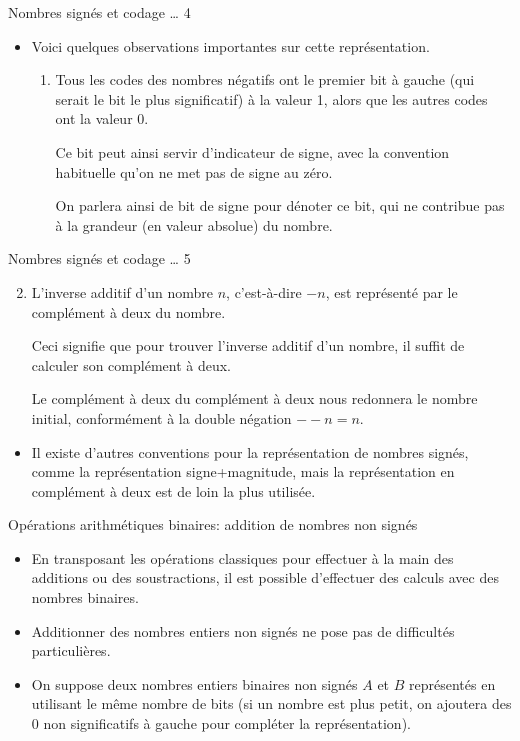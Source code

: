 \documentclass[presentation]{beamer}
\begin{document}
\begin{frame}[label={sec:orgbff1b59}]{Nombres signés et codage \ldots{} 4}
\begin{itemize}
\item Voici quelques observations importantes sur cette représentation.

\begin{enumerate}
\item Tous les codes des nombres négatifs ont le premier bit à gauche (qui serait le bit le plus significatif) à la valeur 1, alors que les autres codes ont la valeur 0.

Ce bit peut ainsi servir d'indicateur de signe, avec la convention habituelle qu'on ne met pas de signe au zéro.

On parlera ainsi de \alert{bit de signe} pour dénoter ce bit, qui ne contribue pas à la grandeur (en valeur absolue) du nombre.
\end{enumerate}
\end{itemize}
\end{frame}

\begin{frame}[label={sec:org19c0fd0}]{Nombres signés et codage \ldots{} 5}
\begin{enumerate}
\setcounter{enumi}{1}
\item L'inverse additif d'un nombre \(n\), c'est-à-dire \(-n\), est représenté par le \alert{complément à deux} du nombre.

Ceci signifie que pour trouver l'inverse additif d'un nombre, il suffit de calculer son complément à deux.

Le complément à deux du complément à deux nous redonnera le nombre initial, conformément à la double négation \(--n = n\).
\end{enumerate}
\begin{itemize}
\item Il existe d'autres conventions pour la représentation de nombres signés, comme la représentation signe+magnitude, mais la représentation en complément à deux est de loin la plus utilisée.
\end{itemize}
\end{frame}

\begin{frame}[label={sec:org6b18f83}]{Opérations arithmétiques binaires: addition de nombres non signés}
\begin{itemize}
\item En transposant les opérations classiques pour effectuer à la main des additions ou des soustractions, il est possible d'effectuer des calculs avec des nombres binaires.

\item Additionner des nombres entiers non signés ne pose pas de difficultés particulières.

\item On suppose deux nombres entiers binaires non signés \(A\) et \(B\) représentés en utilisant le même nombre de bits (si un nombre est plus petit, on ajoutera des 0 non significatifs à gauche pour compléter la représentation).
\end{itemize}
\end{frame}
\end{document}
